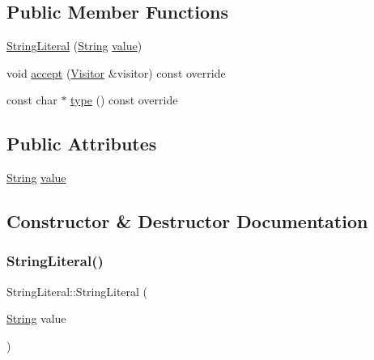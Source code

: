 \subsection*{Public Member Functions}
\begin{DoxyCompactItemize}
\item 
\hyperlink{struct_string_literal_ab13393a39c1e80ac12f68ef53aadd013}{String\+Literal} (\hyperlink{struct_string}{String} \hyperlink{struct_string_literal_afead14d45a2a651fb05695fd0358f41b}{value})
\item 
void \hyperlink{struct_string_literal_a796470cf5573384c12d62520728dea26}{accept} (\hyperlink{struct_visitor}{Visitor} \&visitor) const override
\item 
const char $\ast$ \hyperlink{struct_string_literal_ad9f83f67d287ea9d871a39672a3e64a9}{type} () const override
\end{DoxyCompactItemize}
\subsection*{Public Attributes}
\begin{DoxyCompactItemize}
\item 
\hyperlink{struct_string}{String} \hyperlink{struct_string_literal_afead14d45a2a651fb05695fd0358f41b}{value}
\end{DoxyCompactItemize}


\subsection{Constructor \& Destructor Documentation}
\mbox{\label{struct_string_literal_ab13393a39c1e80ac12f68ef53aadd013}} 
\subsubsection{\texorpdfstring{String\+Literal()}{StringLiteral()}}
{\footnotesize\ttfamily String\+Literal\+::\+String\+Literal (\begin{DoxyParamCaption}\item[{\hyperlink{struct_string}{String}}]{value }\end{DoxyParamCaption})\hspace{0.3cm}{\ttfamily [inline]}}



